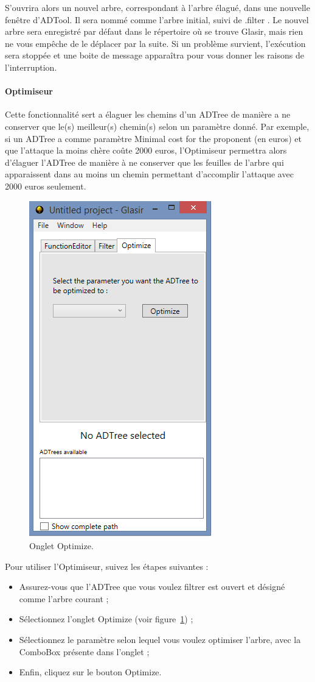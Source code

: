 S'ouvrira alors un nouvel arbre, correspondant à l'arbre élagué, dans une nouvelle fenêtre d'ADTool. Il sera nommé comme l'arbre initial, suivi de \og .filter \fg{}. Le nouvel arbre sera enregistré par défaut dans le répertoire où se trouve Glasir, mais rien ne vous empêche de le déplacer par la suite.
Si un problème survient, l'exécution sera stoppée et une boite de message apparaîtra pour vous donner les raisons de l'interruption.

\paragraph{Optimiseur} Cette fonctionnalité sert a élaguer les chemins d'un ADTree de manière a ne conserver que le(s) meilleur(s) chemin(s) selon un paramètre donné. Par exemple, si un ADTree a comme paramètre \og Minimal cost for the proponent \fg (en euros) et que l'attaque la moins chère coûte 2000 euros, l'Optimiseur permettra alors d'élaguer l'ADTree de manière à ne conserver que les feuilles de l'arbre qui apparaissent dans au moins un chemin permettant d'accomplir l'attaque avec 2000 euros seulement.

 \begin{figure}[H]
        \centering
        \includegraphics[height=0.7\textwidth]{figure/optimizer.png}
        \caption{Onglet Optimize.}
        \label{fig:opti}
    \end{figure}

Pour utiliser l'Optimiseur, suivez les étapes suivantes :

\begin{itemize}
\item Assurez-vous que l'ADTree que vous voulez filtrer est ouvert et désigné comme l'arbre courant ;
\item Sélectionnez l'onglet \og Optimize \fg{} (voir {\sc figure}~\ref{fig:opti}) ;
\item Sélectionnez le paramètre selon lequel vous voulez optimiser l'arbre, avec la ComboBox présente dans l'onglet ;
\item Enfin, cliquez sur le bouton \og Optimize\fg{}.
\end{itemize}

